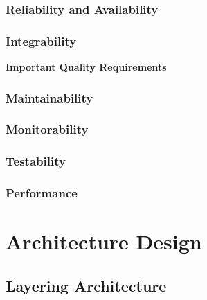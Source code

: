 \documentclass[a4paper,12pt,titlepage]{article}
\begin{document}
		\subsubsection{Reliability and Availability}
			
			
		\subsubsection{Integrability}
			



\textbf{\LARGE Important Quality Requirements}
			
		\subsubsection{Maintainability}
			
			
		\subsubsection{Monitorability}
			
			
		\subsubsection{Testability}
			
			
		\subsubsection{Performance}

\section{Architecture Design}
	\subsection{Layering Architecture}
	
	
\end{document}
